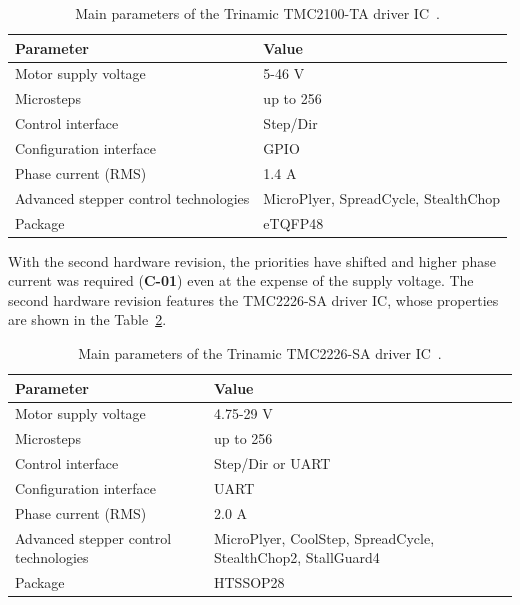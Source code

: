 \begin{table}[H]
    \centering
    \begin{tabular}{ |p{5cm}|p{7cm}| }
        \hline
        Parameter & Value \\
        \hline
        \hline
        Motor supply voltage & 5-46 V \\
        \hline
        Microsteps & up to 256 \\
        \hline
        Control interface & Step/Dir \\
        \hline
        Configuration interface & GPIO \\
        \hline
        Phase current (RMS) & 1.4 A \\
        \hline
        Advanced stepper control technologies & MicroPlyer, SpreadCycle, StealthChop \\
        \hline
        Package & eTQFP48 \\
        \hline
    \end{tabular}
    \caption{Main parameters of the Trinamic TMC2100-TA driver IC~\cite{trinamic_tmc2100-datasheet_2018}.}
    \label{tab:tmc2100_param}
\end{table}


With the second hardware revision, the priorities have shifted and higher phase current was required (\textbf{C-01}) even at the expense of the supply voltage.
The second hardware revision features the TMC2226-SA driver IC, whose properties are shown in the Table~\ref{tab:tmc2226_param}.

\begin{table}[H]
    \centering
    \begin{tabular}{ |p{5cm}|p{7cm}| }
        \hline
        Parameter & Value \\
        \hline
        \hline
        Motor supply voltage & 4.75-29 V \\
        \hline
        Microsteps & up to 256 \\
        \hline
        Control interface & Step/Dir or UART \\
        \hline
        Configuration interface & UART \\
        \hline
        Phase current (RMS) & 2.0 A \\
        \hline
        Advanced stepper control technologies & MicroPlyer, CoolStep, SpreadCycle, StealthChop2, StallGuard4 \\
        \hline
        Package & HTSSOP28 \\
        \hline
    \end{tabular}
    \caption{Main parameters of the Trinamic TMC2226-SA driver IC~\cite{trinamic_tmc2226_2020}.}
    \label{tab:tmc2226_param}
\end{table}


